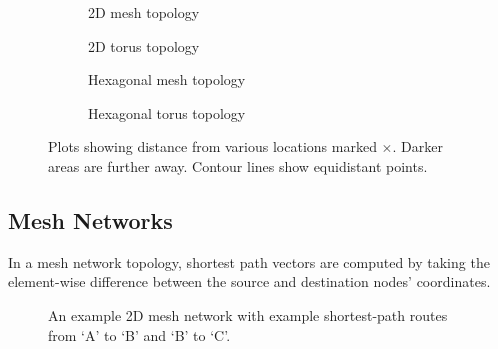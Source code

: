		\begin{figure}
			\center
			
			\begin{subfigure}{\linewidth}
				\center
				\caption{2D mesh topology}
				\label{fig:distance-map-mesh}
			\end{subfigure}
			
			\vspace{1em}
			
			\begin{subfigure}{\linewidth}
				\center
				\caption{2D torus topology}
				\label{fig:distance-map-torus}
			\end{subfigure}
			
			\vspace{1em}
			
			\begin{subfigure}{\linewidth}
				\center
				\caption{Hexagonal mesh topology}
				\label{fig:distance-map-hex-mesh}
			\end{subfigure}
			
			\vspace{1em}
			
			\begin{subfigure}{\linewidth}
				\center
				\caption{Hexagonal torus topology}
				\label{fig:distance-map-hex-torus}
			\end{subfigure}
			
			\caption{Plots showing distance from various locations marked
			         {\color{red}$\times$}. Darker areas are further away. Contour
			         lines show equidistant points.}
			\label{fig:distance-map}
		\end{figure}
		
		\subsection{Mesh Networks}
			
			In a mesh network topology, shortest path vectors are computed by taking
			the element-wise difference between the source and destination nodes'
			coordinates.
			
			\begin{figure}
				\center
				\caption{An example 2D mesh network with example shortest-path routes
				from `A' to `B' and `B' to `C'.}
				\label{fig:mesh-topology-coordinates}
			\end{figure}
			
